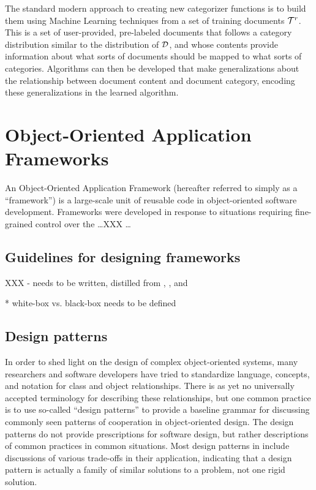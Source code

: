 The standard modern approach to creating new categorizer functions is
to build them using Machine Learning techniques from a set of training
documents $\mathcal{T}^r$.\cite[p. 2]{sebastiani:02} This is a set of
user-provided, pre-labeled documents that follows a category
distribution similar to the distribution of $\mathcal{D}$, and whose contents
provide information about what sorts of documents should be mapped to
what sorts of categories.  Algorithms can then be developed that make
generalizations about the relationship between document content and
document category, encoding these generalizations in the learned algorithm.

\section{Object-Oriented Application Frameworks}

An Object-Oriented Application Framework (hereafter referred to simply
as a ``framework'') is a large-scale unit of reusable code in
object-oriented
software development.  Frameworks were developed in response to
situations requiring fine-grained control over the \ldots XXX \ldots

\subsection{Guidelines for designing frameworks}

XXX - needs to be written, distilled from \cite{fayad:99},
\cite{johnson:97}, and \cite{fayad:97}

 * white-box vs. black-box needs to be defined

\subsection{Design patterns}
\label{patterns}

In order to shed light on the design of complex object-oriented
systems, many researchers and software developers have tried to
standardize language, concepts, and notation for class and object
relationships.  There is as yet no universally accepted terminology
for describing these relationships, but one common practice is to use
so-called ``design patterns'' to provide a baseline grammar for
discussing commonly seen patterns of cooperation in object-oriented
design. \cite[p. 3]{gamma:95} The design patterns do not provide
prescriptions for software design, but rather descriptions of common
practices in common situations.  Most design patterns in
\cite{gamma:95} include discussions of various trade-offs in their
application, indicating that a design pattern is actually a family of
similar solutions to a problem, not one rigid solution.

